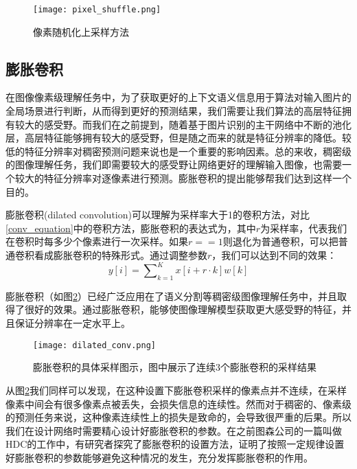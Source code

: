 \documentclass[master]{thesis-uestc}
\begin{document}
\begin{figure}[h]
    \texttt{[image: pixel\_shuffle.png]}
    \caption{像素随机化上采样方法}
    \label{pixel_shuffle}
\end{figure}

\subsection{膨胀卷积}
在图像像素级理解任务中，为了获取更好的上下文语义信息用于算法对输入图片的全局场景进行判断，从而得到更好的预测结果，我们需要让我们算法的高层特征拥有较大的感受野。而我们在之前提到，随着基于图片识别的主干网络中不断的池化层，高层特征能够拥有较大的感受野，但是随之而来的就是特征分辨率的降低。较低的特征分辨率对稠密预测问题来说也是一个重要的影响因素。总的来收，稠密级的图像理解任务，我们即需要较大的感受野让网络更好的理解输入图像，也需要一个较大的特征分辨率对逐像素进行预测。膨胀卷积的提出能够帮我们达到这样一个目的。

膨胀卷积(dilated convolution)可以理解为采样率大于1的卷积方法，对比\ref{conv_equation}中的卷积方法，膨胀卷积的表达式为，其中$r$为采样率，代表我们在卷积时每多少个像素进行一次采样。如果$r == 1$则退化为普通卷积，可以把普通卷积看成膨胀卷积的特殊形式。通过调整参数$r$，我们可以达到不同的效果：
\begin{equation}
	y[i] = \sum\nolimits_{k = 1}^{K} x[i + r \cdot k] w[k]
\end{equation}

膨胀卷积（如图\ref{dilated_conv}）已经广泛应用在了语义分割等稠密级图像理解任务中，并且取得了很好的效果。通过膨胀卷积，能够使图像理解模型获取更大感受野的特征，并且保证分辨率在一定水平上。

\begin{figure}[h]
    \texttt{[image: dilated\_conv.png]}
    \caption{膨胀卷积的具体采样图示，图中展示了连续3个膨胀卷积的采样结果}
    \label{dilated_conv}
\end{figure}

从图\ref{dilated_conv}我们同样可以发现，在这种设置下膨胀卷积采样的像素点并不连续，在采样像素中间会有很多像素点被丢失，会损失信息的连续性。然而对于稠密的、像素级的预测任务来说，这种像素连续性上的损失是致命的，会导致很严重的后果。所以我们在设计网络时需要精心设计好膨胀卷积的参数。在之前图森公司的一篇叫做HDC的工作中，有研究者探究了膨胀卷积的设置方法，证明了按照一定规律设置好膨胀卷积的参数能够避免这种情况的发生，充分发挥膨胀卷积的作用。 
\end{document}
